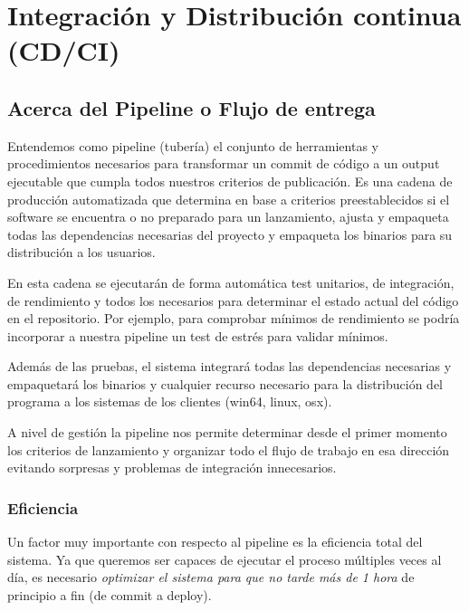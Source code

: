 
\section{Integración y Distribución continua (CD/CI)}\label{pipeline:entrega-continua}

\subsection{Acerca del Pipeline o Flujo de entrega}

Entendemos como pipeline (tubería) el conjunto de herramientas y procedimientos necesarios para transformar un commit de código a un output ejecutable que cumpla todos nuestros criterios de publicación. Es una cadena de producción automatizada que determina en base a criterios preestablecidos si el software se encuentra o no preparado para un lanzamiento, ajusta y empaqueta todas las dependencias necesarias del proyecto y empaqueta los binarios para su distribución a los usuarios.

En esta cadena se ejecutarán de forma automática test unitarios, de integración, de rendimiento y todos los necesarios para determinar el estado actual del código en el repositorio. Por ejemplo, para comprobar mínimos de rendimiento se podría incorporar a nuestra pipeline un test de estrés para validar  mínimos.

Además de las pruebas, el sistema integrará todas las dependencias necesarias y empaquetará los binarios y cualquier recurso necesario para la distribución del programa a los sistemas de los clientes (win64, linux, osx).

A nivel de gestión la pipeline nos permite determinar desde el primer momento los criterios de lanzamiento y organizar todo el flujo de trabajo en esa dirección evitando sorpresas y problemas de integración innecesarios.

\subsubsection{Eficiencia}\label{pipeline:eficiencia}

Un factor muy importante con respecto al pipeline es la eficiencia total del sistema. Ya que queremos ser capaces de ejecutar el proceso múltiples veces al día, es necesario \emph{optimizar el sistema para que no tarde más de 1 hora} de principio a fin (de commit a deploy).

